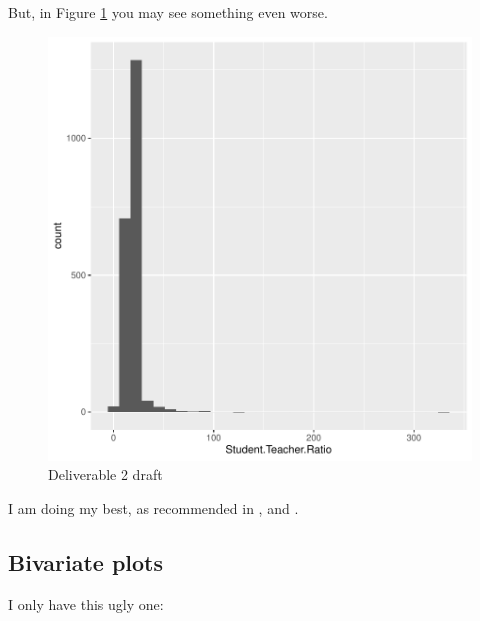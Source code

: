 \documentclass[a4paper, 12pt]{article}
\begin{document}
But, in Figure \ref{fig:theDeli_2} you may see something even worse.

\begin{figure}[h]
\centering
\includegraphics{draft_paper_v2-theDeli_2}
\caption{Deliverable 2 draft}  %
\label{fig:theDeli_2} %
\end{figure}
I am doing my best, as recommended in \citet{magallanes_reyes_data_2022}, and \citet{leisch_sweave_2024}. 

\subsection{Bivariate plots}

I only have this ugly one:
\end{document}
